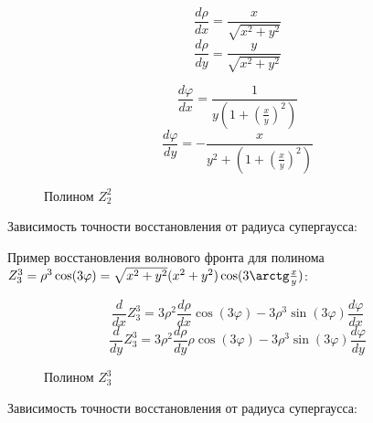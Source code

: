 \documentclass[oneside, final, 14pt]{article}
\begin{document}
$$\frac{d\rho}{dx}  = \frac{x}{\sqrt{x^2 + y^2}}$$
$$\frac{d\rho}{dy}  = \frac{y}{\sqrt{x^2 + y^2}}$$

$$\frac{d\varphi}{dx}  = \frac{1}{y (1 + (\frac{x}{y})^2)}$$
$$\frac{d\varphi}{dy}  = -\frac{x}{y^2 + (1 + (\frac{x}{y})^2)}$$



\begin{figure}
\caption{Полином $Z_2^2$}
\label{fig:image}
\end{figure}

Зависимость точности восстановления от радиуса супергаусса:
\begin{figure}
\begin{minipage}[h]{0.49\linewidth}
\end{minipage}
\hfill
\begin{minipage}[h]{0.49\linewidth}
\end{minipage}

\label{ris:image1}
\end{figure}

\begin{center}
Пример восстановления волнового фронта для полинома $Z_3^3 = \rho^3 \cos(3\varphi) = 
\sqrt{x^2 + y^2}(x^2 + y^2)\cos(3 \arctg\frac{x}{y} )$:
\end{center}
$$
\frac{d}{dx} Z_3^3 = 3 \rho^2 \frac{d\rho}{dx}  \cos(3 \varphi) - 3\rho^3 \sin(3 \varphi) \frac{d\varphi}{dx} 
$$
$$
\frac{d}{dy} Z_3^3 = 3 \rho^2 \frac{d\rho}{dy} \rho \cos(3 \varphi) - 3\rho^3 \sin(3 \varphi) \frac{d\varphi}{dy} 
$$
\begin{figure}[h]
	\caption{Полином $Z_3^3$}
	\label{fig:image}
\end{figure}

Зависимость точности восстановления от радиуса супергаусса:
\begin{figure}
	\begin{minipage}[h]{0.49\linewidth}
	\end{minipage}
	\hfill
	\begin{minipage}[h]{0.49\linewidth}
	\end{minipage}
	
	\label{ris:image1}
\end{figure}
\end{document}
